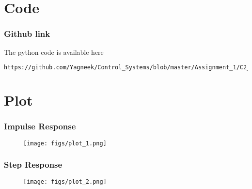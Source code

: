 \documentclass{beamer}
\theoremstyle{remark}
\numberwithin{equation}{section}
\begin{document}
\section{Code}

\begin{frame}[fragile]
\frametitle{Github link}
    The python code is available here
    {\footnotesize
\begin{lstlisting}
https://github.com/Yagneek/Control_Systems/blob/master/Assignment_1/C2_P33.py
\end{lstlisting}
}
\end{frame}

\section{Plot}
\begin{frame}[fragile]
\frametitle{Impulse Response}
\begin{figure}
\centering
\texttt{[image: figs/plot\_1.png]}
\label{fig:plane}
\end{figure}
\end{frame}

\begin{frame}[fragile]
\frametitle{Step Response}
\begin{figure}
\centering
\texttt{[image: figs/plot\_2.png]}
\label{fig:plane}
\end{figure}
\end{frame}
%
%  
%
%
\end{document}
